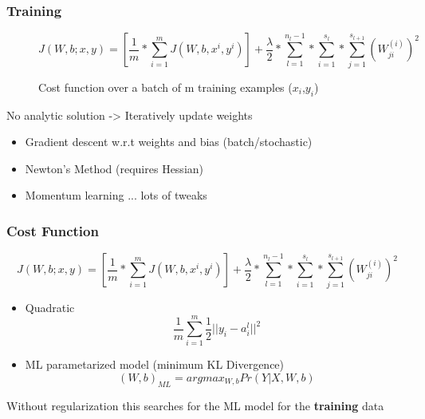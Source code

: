 \documentclass{beamer}
\begin{document}
\begin{frame}[fragile]
	\frametitle{Training}
	\begin{figure}
		\begin{small}
			\begin{equation}
			J(W,b;x,y) = [\frac{1}{m}*\sum_{i=1}^{m} J(W,b,x^i,y^i)] + \frac{\lambda}{2}*\sum_{l=1}^{n_l-1}*\sum_{i=1}^{s_l}*\sum_{j=1}^{s_{l+1}}(W_{ji}^{(i)})^2
			\end{equation}
		\end{small}
		\caption{Cost function over a batch of m training examples ($x_i$,$y_i$) \cite{ng2011sparse}}
	\end{figure}
	No analytic solution -> Iteratively update weights
	\begin{itemize}
		\item Gradient descent w.r.t weights and bias (batch/stochastic)
		\item Newton's Method (requires Hessian) 
		\item Momentum learning ... lots of tweaks
	\end{itemize}
\end{frame}


\begin{frame}[fragile]
\frametitle{Cost Function}
	\begin{tiny}
		\begin{equation}
			J(W,b;x,y) = [\frac{1}{m}*\sum_{i=1}^{m} J(W,b,x^i,y^i)] + \frac{\lambda}{2}*\sum_{l=1}^{n_l-1}*\sum_{i=1}^{s_l}*\sum_{j=1}^{s_{l+1}}(W_{ji}^{(i)})^2
			\end{equation}
	\end{tiny}
	\normalsize
	\begin{itemize}
	\item 		
		Quadratic
		\begin{equation}
			\frac{1}{m}\sum_{i=1}^{m}\frac{1}{2}||y_i - a^l_i||^{2}
		\end{equation}
	\item 
		ML parametarized model (minimum KL Divergence)  \cite{ng2011sparse}
		\begin{equation}
			(W,b)_{ML} = argmax_{W,b}Pr(Y|X,W,b)
		\end{equation}
	\end{itemize}
	\begin{small}
		Without regularization this searches for the ML model for the \textbf{training} data 
	\end{small}
\end{frame}
\end{document}
